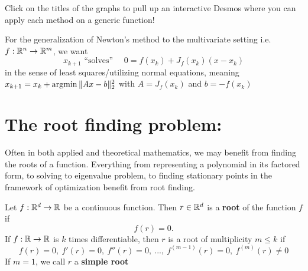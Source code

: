 \documentclass[11pt]{article}
\begin{document}
Click on the titles of the graphs to pull up an interactive Desmos where you can apply each method on a generic function!

For the generalization of Newton's method to the multivariate setting i.e. $f : \mathbb{R}^n \to \mathbb{R}^m$, we want $$x_{k+1} \text{ ``solves'' } \quad 0 = f(x_k) + J_f(x_k)(x-x_k)$$ in the sense of least squares/utilizing normal equations,
meaning $x_{k+1} = x_k + \argmin \|Ax - b\|_2^2$ with $A = J_f(x_k)$ and $b = -f(x_k)$
\newpage
\section{The root finding problem:} Often in both applied and theoretical mathematics, we may benefit from finding the roots of a function. Everything from representing a polynomial in its factored form, to solving to eigenvalue problem, to finding stationary points in the framework of optimization benefit from root finding. 
\begin{definition}
    Let $f : \mathbb{R}^d \to \mathbb{R}$ be a continuous function. Then $r \in \mathbb{R}^d$ is a \textbf{root} of the function $f$ if $$f(r) = 0.$$
    If $f : \mathbb{R} \to \mathbb{R}$ is $k$ times differentiable, then $r$ is a root of multiplicity $m \leq k$ if $$f(r) = 0, \ f'(r) = 0, \ f''(r) = 0,\  ..., \ f^{(m-1)}(r) = 0, \ f^{(m)}(r) \ne 0$$
    If $ m = 1$, we call $r$ a \textbf{simple root}
\end{definition}
\end{document}

